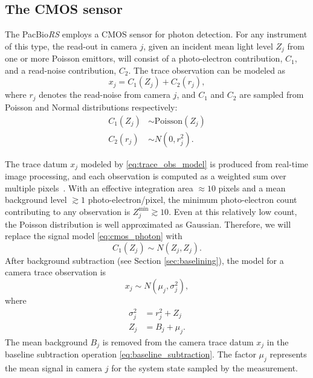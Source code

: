 \documentclass[10pt]{article}
\newcommand{\cmos}{{\small CMOS}}
\newcommand{\TheRS}{The PacBio\hspace{2 pt}\textit{RS}}
\newcommand{\poissdist}[1]{\ensuremath{\text{Poisson}(#1)}}
\newcommand{\normdist}[2]{\ensuremath{N(#1, #2)}}
\begin{document}
\subsection{The CMOS sensor}
\TheRS{} employs a \cmos{} sensor for photon detection.  For any instrument of this type, the read-out in camera $j$, given an incident mean light level $Z_j$ from one or more Poisson emittors, will consist of a photo-electron contribution, $C_1$, and a read-noise contribution, $C_2$.  The trace observation can be modeled as
\begin{equation}
\label{eq:trace_obs_model}
x_j = C_1(Z_j) + C_2(r_j),
\end{equation}
where $r_j$ denotes the read-noise from camera $j$, and $C_1$ and $C_2$ are sampled from Poisson and Normal distributions respectively:
\begin{subequations}
\begin{align}
C_1(Z_j) &\sim \poissdist{Z_j} \label{eq:cmos_photon}\\
C_2(r_j) &\sim \normdist{0}{r_j^2}. \label{eq:cmos_read}
\end{align}
\end{subequations}

The trace datum $x_j$ modeled by \eqref{eq:trace_obs_model} is produced from real-time image processing, and each observation is computed as a weighted sum over multiple pixels~\cite{Gehman2010}.  With an effective integration area $\approx 10$ pixels and a mean background level $\gtrsim 1$ photo-electron/pixel, the minimum photo-electron count contributing to any observation is
$
Z_j^{\min} \gtrsim 10.
$
Even at this relatively low count, the Poisson distribution is well approximated as Gaussian.
Therefore, we will replace the signal model \eqref{eq:cmos_photon} with
\begin{equation}
C_1(Z_j) \sim \normdist{Z_j}{Z_j}.
\end{equation} 
After background subtraction (see Section \ref{sec:baselining}), the model for a camera trace observation is
\begin{equation}
\label{eq:trace_data_model}
x_j \sim \normdist{\mu_j}{\sigma_j^2},
\end{equation}
where
\begin{subequations}
\label{eq:sensor_model}
\begin{align}
\sigma_j^2 &= r_j^2 + Z_j \label{eq:sensor_error}\\
Z_j &= B_j + \mu_j. \label{eq:sensor_signal}
\end{align}
\end{subequations}
The mean background $B_j$ is removed from the camera trace datum $x_j$ in the baseline subtraction operation \eqref{eq:baseline_subtraction}.  The factor $\mu_j$ represents the mean signal in camera $j$ for the system state sampled by the measurement.
\end{document}
